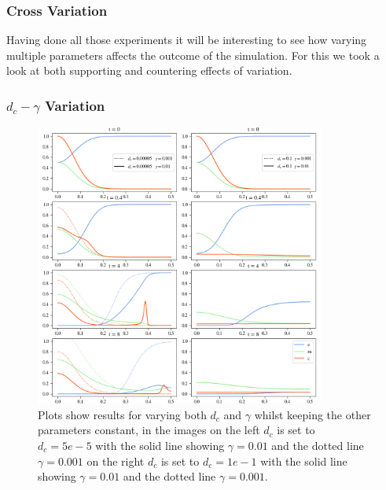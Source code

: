 \subsubsection*{Cross Variation}
Having done all those experiments it will be interesting to see how varying multiple parameters affects the outcome of the simulation. For this we took a look at both supporting and countering effects of variation. 

\subsubsection*{$d_c - \gamma$ Variation}
\begin{figure}[h]
    \centering
    \includegraphics[width=0.85\textwidth]{resources/images/dc_gamma_variation.png}
    \caption{Plots show results for varying both $d_c$ and $\gamma$ whilst keeping the other parameters constant, in the images on the left $d_c$ is set to $d_c=5e-5$ with the solid line showing $\gamma = 0.01$ and the dotted line $\gamma=0.001$ on the right $d_c$ is set to $d_c=1e-1$ with the solid line showing $\gamma = 0.01$ and the dotted line $\gamma=0.001$.}
    \label{fig:dc_gamma_variation}
\end{figure}

